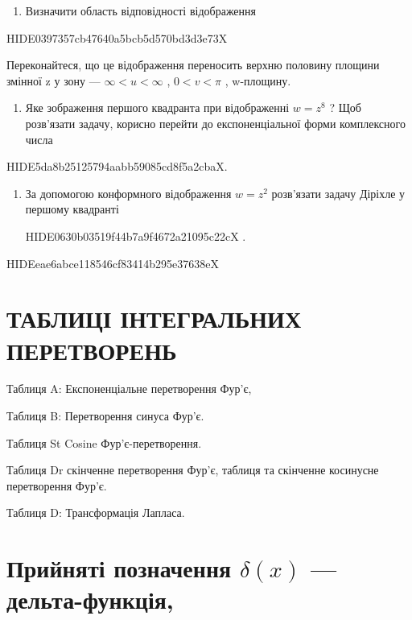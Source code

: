 \documentclass[
  ukrainian,
]{article}
\providecommand{\tightlist}{%
  \setlength{\itemsep}{0pt}\setlength{\parskip}{0pt}}
\begin{document}
\begin{enumerate}
\def\labelenumi{\arabic{enumi}.}
\tightlist
\item
  Визначити область відповідності відображення
\end{enumerate}

HIDE0397357cb47640a5bcb5d570bd3d3e73X

Переконайтеся, що це відображення переносить верхню половину площини
змінної z у зону --- \(\infty < u < \infty\) , \(0 < v < \pi\) ,
w-площину.

\begin{enumerate}
\def\labelenumi{\arabic{enumi}.}
\setcounter{enumi}{1}
\tightlist
\item
  Яке зображення першого квадранта при відображенні \(w=z^{8}\) ? Щоб
  розв'язати задачу, корисно перейти до експоненціальної форми
  комплексного числа
\end{enumerate}

HIDE5da8b25125794aabb59085cd8f5a2cbaX.

\begin{enumerate}
\def\labelenumi{\arabic{enumi}.}
\setcounter{enumi}{2}
\item
  За допомогою конформного відображення \(w=z^2\) розв'язати задачу
  Діріхле у першому квадранті

  HIDE0630b03519f44b7a9f4672a21095c22cX \right.
\end{enumerate}

HIDEeae6abce118546cf83414b295e37638eX

\section{ТАБЛИЦІ ІНТЕГРАЛЬНИХ
ПЕРЕТВОРЕНЬ}\label{ux442ux430ux431ux43bux438ux446ux456-ux456ux43dux442ux435ux433ux440ux430ux43bux44cux43dux438ux445-ux43fux435ux440ux435ux442ux432ux43eux440ux435ux43dux44c-1}

Таблиця A: Експоненціальне перетворення Фур'є,

Таблиця B: Перетворення синуса Фур'є.

Таблиця St Cosine Фур'є-перетворення.

Таблиця Dr скінченне перетворення Фур'є, таблиця та скінченне косинусне
перетворення Фур'є.

Таблиця D: Трансформація Лапласа.

\section{\texorpdfstring{Прийняті позначення \(\delta\left(x\right)\)
---
дельта-функція,}{Прийняті позначення \textbackslash delta\textbackslash left(x\textbackslash right) --- дельта-функція,}}\label{ux43fux440ux438ux439ux43dux44fux442ux456-ux43fux43eux437ux43dux430ux447ux435ux43dux43dux44f-deltaleftxright-ux434ux435ux43bux44cux442ux430-ux444ux443ux43dux43aux446ux456ux44f-1}
\end{document}
